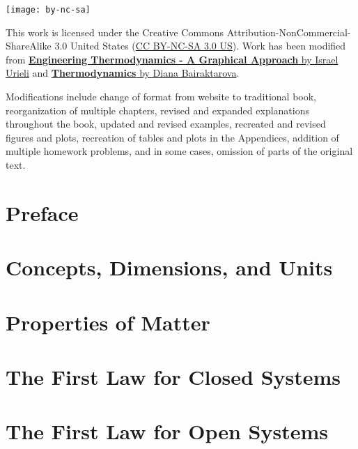 \frontmatter
\maketitle

\texttt{[image: by-nc-sa]}

This work is licensed under the Creative Commons Attribution-NonCommercial-ShareAlike 3.0 United States (\href{https://creativecommons.org/licenses/by-nc-sa/3.0/us/}{CC BY-NC-SA 3.0 US}).  Work has been modified from \href{https://www.ohio.edu/mechanical/thermo/}{{\bf Engineering Thermodynamics - A Graphical Approach} by Israel Urieli} and \href{https://thermo.pressbooks.com/front-matter/letter-to-students/}{{\bf Thermodynamics} by Diana Bairaktarova}.

Modifications include change of format from website to traditional book,
reorganization of multiple chapters,
revised and expanded explanations throughout the book,
updated and revised examples,
recreated and revised figures and plots,
recreation of tables and plots in the Appendices,
addition of multiple homework problems,
and in some cases, omission of parts of the original text.


\tableofcontents

\chapter{Preface}


\mainmatter

\chapter{Concepts, Dimensions, and Units} \label{ch:intro}


\chapter{Properties of Matter} \label{ch:matter_properties}


\chapter{The First Law for Closed Systems} \label{ch:closed_systems}


\chapter{The First Law for Open Systems} \label{ch:open_systems}


